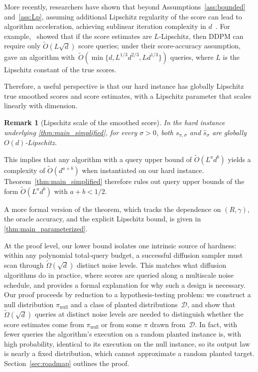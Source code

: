 \documentclass[11pt,letterpaper]{article}
\newtheorem{remark}[theorem]{Remark}
\newcommand{\1}{\mathbbm{1}}
\begin{document}
More recently, researchers have shown that beyond Assumptions~\ref{ass:bounded} and~\ref{ass:Lp}, assuming additional Lipschitz regularity of the score can lead to algorithm acceleration, achieving sublinear iteration complexity in $d$~\citep{gupta2024randomized,li2025improved}. For example,~\cite{zhang2025sublinear} showed that if the score estimates are $L$-Lipschitz, then DDPM can require only $\widetilde O(L\sqrt{d})$ score queries; under their score-accuracy assumption, \cite{jiaoli2024instancedependent} gave an algorithm with~$\widetilde O(\min\{d,L^{1/3}d^{2/3},Ld^{1/3}\})$ queries, where $L$ is the Lipschitz constant of the true scores.

Therefore, a useful perspective is that our hard instance has globally Lipschitz true smoothed scores and score estimates, with a Lipschitz parameter that scales linearly with dimension.



\begin{remark}[Lipschitz scale of the smoothed score]
\label{rmk:lip}
In the hard instance underlying \cref{thm:main_simplified}, for every $\sigma>0$, both $s_{\pi,\sigma}$ and $\widehat s_\sigma$ are globally $O(d)$-Lipschitz.
\end{remark}


This implies that any algorithm with a query upper bound of $\widetilde O(L^a d^b)$ yields a complexity of $\widetilde O(d^{a+b})$ when instantiated on our hard instance.
Theorem~\ref{thm:main_simplified} therefore rules out query upper bounds of the form $\widetilde O(L^a d^b)$ with $a+b<1/2$.

A more formal version of the theorem, which tracks the dependence on $(R,\gamma)$, the oracle accuracy, and the explicit Lipschitz bound, is given in \cref{thm:main_parameterized}.



At the proof level, our lower bound isolates one intrinsic source
of hardness: within any polynomial total-query budget,
a successful diffusion sampler must scan through
$\widetilde\Omega(\sqrt{d})$ distinct noise levels.
This matches what diffusion algorithms do in practice, where scores
are queried along a multiscale noise schedule, and provides a
formal explanation for why such a design is necessary.
Our proof proceeds by reduction to a hypothesis-testing problem:
we construct a null distribution $\pi_{\mathrm{null}}$ and a class
of planted distributions~$\mathcal{D}$, and show that
$\widetilde\Omega(\sqrt{d})$ queries at distinct noise levels are
needed to distinguish whether the score estimates come from
$\pi_{\mathrm{null}}$ or from some $\pi$ drawn
from~$\mathcal{D}$.
In fact, with fewer queries the algorithm's execution on a random planted
instance is, with high probability, identical to its execution on the null
instance, so its output law is nearly a fixed distribution, which cannot
approximate a random planted target.
Section~\ref{sec:roadmap} outlines the proof.
\end{document}
